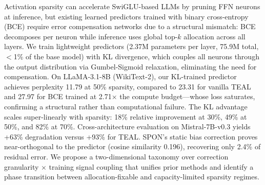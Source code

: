 Activation sparsity can accelerate SwiGLU-based LLMs by pruning FFN neurons at inference, but existing learned predictors trained with binary cross-entropy (BCE) require error compensation networks due to a structural mismatch: BCE decomposes per neuron while inference uses global top-$k$ allocation across all layers.
We train lightweight predictors (2.37M parameters per layer, 75.9M total, $<$1\% of the base model) with KL divergence, which couples all neurons through the output distribution via Gumbel-Sigmoid relaxation, eliminating the need for compensation.
On LLaMA-3.1-8B (WikiText-2), our KL-trained predictor achieves perplexity 11.79 at 50\% sparsity, compared to 23.31 for vanilla TEAL and 27.97 for BCE trained at 2.71$\times$ the compute budget---whose loss saturates, confirming a structural rather than computational failure.
The KL advantage scales super-linearly with sparsity: 18\% relative improvement at 30\%, 49\% at 50\%, and 82\% at 70\%.
Cross-architecture evaluation on Mistral-7B-v0.3 yields +63\% degradation versus +93\% for TEAL.
SPON's static bias correction proves near-orthogonal to the predictor (cosine similarity 0.196), recovering only 2.4\% of residual error.
We propose a two-dimensional taxonomy over correction granularity $\times$ training signal coupling that unifies prior methods and identify a phase transition between allocation-fixable and capacity-limited sparsity regimes.
